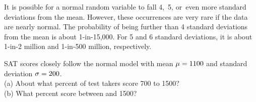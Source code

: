 It is possible for a normal random variable to fall 4,~5,
or~even more standard deviations from the mean.
However, these occurrences are very rare if the data are
nearly normal.
The probability of being further than 4 standard deviations
from the mean is about 1-in-15,000.
For 5 and 6 standard deviations, it is about 1-in-2 million
and 1-in-500 million, respectively.

\begin{exercisewrap}
\begin{nexercise}
SAT scores closely follow the normal model with mean
$\mu = 1100{}$ and standard deviation
$\sigma = 200{}$.\footnotemark{} \\
(a) About what percent of test takers score 700 to 1500? \\
(b) What percent score between \satmean{} and 1500?
\end{nexercise}
\end{exercisewrap}




